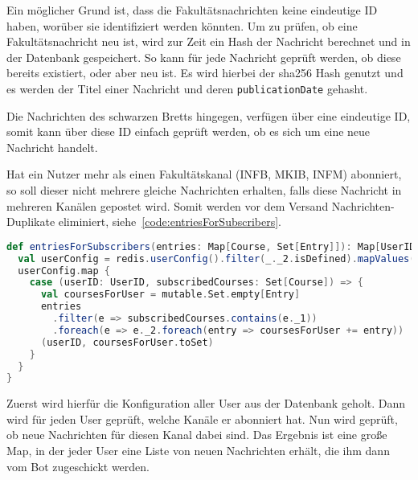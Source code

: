 Ein möglicher Grund ist, dass die Fakultätsnachrichten keine eindeutige ID haben, worüber sie identifiziert werden könnten. Um zu prüfen, ob eine Fakultätsnachricht neu ist, wird zur Zeit ein Hash der Nachricht berechnet und in der Datenbank gespeichert. So kann für jede Nachricht geprüft werden, ob diese bereits existiert, oder aber neu ist. Es wird hierbei der sha256 Hash genutzt und es werden der Titel einer Nachricht und deren \texttt{publicationDate} gehasht.

Die Nachrichten des schwarzen Bretts hingegen, verfügen über eine eindeutige ID, somit kann über diese ID einfach geprüft werden, ob es sich um eine neue Nachricht handelt.

Hat ein Nutzer mehr als einen Fakultätskanal (INFB, MKIB, INFM) abonniert, so soll dieser nicht mehrere gleiche Nachrichten erhalten, falls diese Nachricht in mehreren Kanälen gepostet wird. Somit werden vor dem Versand Nachrichten-Duplikate eliminiert, siehe~\autoref{code:entriesForSubscribers}.

\begin{lstlisting}[language=scala, style=scala, caption={Verteilung der Nachrichten auf die Subscriber und Eliminierung von Duplikaten}, label={code:entriesForSubscribers}]
def entriesForSubscribers(entries: Map[Course, Set[Entry]]): Map[UserID, Set[Entry]] = {
  val userConfig = redis.userConfig().filter(_._2.isDefined).mapValues(_.get)
  userConfig.map {
    case (userID: UserID, subscribedCourses: Set[Course]) => {
      val coursesForUser = mutable.Set.empty[Entry]
      entries
        .filter(e => subscribedCourses.contains(e._1))
        .foreach(e => e._2.foreach(entry => coursesForUser += entry))
      (userID, coursesForUser.toSet)
    }
  }
}
\end{lstlisting}

Zuerst wird hierfür die Konfiguration aller User aus der Datenbank geholt. Dann wird für jeden User geprüft, welche Kanäle er abonniert hat. Nun wird geprüft, ob neue Nachrichten für diesen Kanal dabei sind. Das Ergebnis ist eine große Map, in der jeder User eine Liste von neuen Nachrichten erhält, die ihm dann vom Bot zugeschickt werden.
